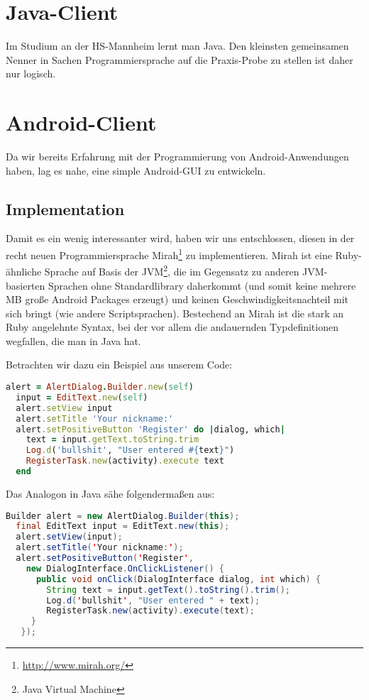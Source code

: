 \documentclass[12pt, a4paper]{scrartcl}
\begin{document}
\clearpage
\section{Java-Client}

Im Studium an der HS-Mannheim lernt man Java. Den kleinsten gemeinsamen Nenner
in Sachen Programmiersprache auf die Praxis-Probe zu stellen ist daher nur
logisch.
\np


\clearpage

\section{Android-Client}

Da wir bereits Erfahrung mit der Programmierung von Android-Anwendungen haben,
lag es nahe, eine simple Android-GUI zu entwickeln.

\subsection{Implementation}

Damit es ein wenig interessanter wird, haben wir uns entschlossen, diesen in
der recht neuen Programmiersprache Mirah\footnote{\url{http://www.mirah.org/}}
zu implementieren. Mirah ist eine Ruby-ähnliche Sprache auf Basis der
JVM\footnote{Java Virtual Machine}, die im Gegensatz zu anderen JVM-basierten
Sprachen ohne Standardlibrary daherkommt (und somit keine mehrere MB große
Android Packages erzeugt) und keinen Geschwindigkeitsnachteil mit sich bringt
(wie andere Scriptsprachen). Bestechend an Mirah ist die stark an Ruby
angelehnte Syntax, bei der vor allem die andauernden Typdefinitionen wegfallen,
die man in Java hat.
\np

Betrachten wir dazu ein Beispiel aus unserem Code:
\begin{lstlisting}[language=Ruby]
  alert = AlertDialog.Builder.new(self)
  input = EditText.new(self)
  alert.setView input
  alert.setTitle 'Your nickname:'
  alert.setPositiveButton 'Register' do |dialog, which|
    text = input.getText.toString.trim
    Log.d('bullshit', "User entered #{text}")
    RegisterTask.new(activity).execute text
  end
\end{lstlisting}

Das Analogon in Java sähe folgendermaßen aus:
\begin{lstlisting}[language=Java]
  Builder alert = new AlertDialog.Builder(this);
  final EditText input = EditText.new(this);
  alert.setView(input);
  alert.setTitle('Your nickname:');
  alert.setPositiveButton('Register',
    new DialogInterface.OnClickListener() {
      public void onClick(DialogInterface dialog, int which) {
        String text = input.getText().toString().trim();
        Log.d('bullshit', "User entered " + text);
        RegisterTask.new(activity).execute(text);
     }
   });
\end{lstlisting}
\end{document}
